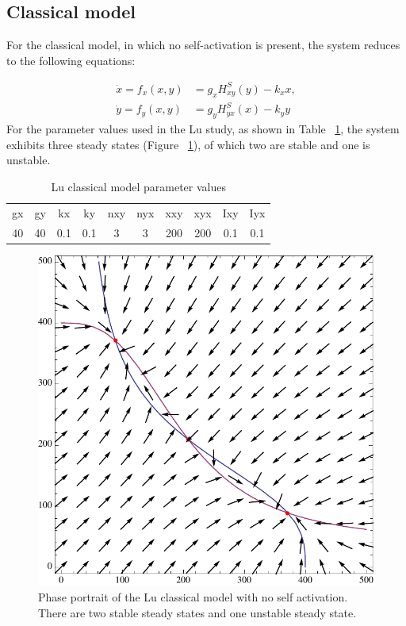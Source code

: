 \clearpage

\subsection{Classical model}
For the classical model, in which no self-activation is present, the system reduces to the following equations:

\begin{align}
\dot{x}=f_{x}(x,y) &= g_{x}H^{S}_{xy}(y)-k_{x}x,\label{eq:lu_cl_1}\\
\dot{y}=f_{y}(x,y) &= g_{y}H^{S}_{yx}(x)-k_{y}y\label{eq:lu_cl_2}
\end{align}
For the parameter values used in the Lu study, as shown in Table ~\ref{tab:lu_cl_bi}, the system exhibits three steady states (Figure ~\ref{fig:lu_bis_class}), of which two are stable and one is unstable. 

\begin{table}[htbp]
\centering
\caption{Lu classical model parameter values}
\label{tab:lu_cl_bi}
\begin{tabular}{cccccccccc}
gx    & gy    & kx    & ky    & nxy & nyx & xxy     & xyx     & Ixy   & Iyx \\
40&40     &0.1   & 0.1   &  3  &  3  &  200    &  200    & 0.1    &   0.1
\end{tabular}
\end{table}

\begin{figure}[htbp]
\centering
\includegraphics[scale=0.7]{chapterModelling/Lu_switches/images/Lu/mae/classic.pdf}
\caption[Phase portrait of the Lu classical model with no self activation]{Phase portrait of the Lu classical model with no self activation. There are two stable steady states and one unstable steady state.}
\label{fig:lu_bis_class}
\end{figure}


